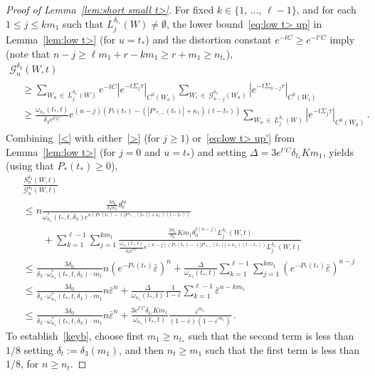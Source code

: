 \documentclass[10pt]{amsart}
\theoremstyle{definition}\newtheorem{defi}[theo]{Definition}\newtheorem{rema}[theo]{Remark}\newtheorem{exam}[theo]{Example}\newtheorem{exem}[theo]{Example}\newtheorem{nota}[theo]{Notation}
\newcommand{\cG}{\mathcal{G}}
\newcommand{\ve}{\varepsilon}
\begin{document}
\begin{proof}[Proof of Lemma~\ref{lem:short small t>}]
For fixed $k\in \{1,\,\ldots,\,\ell-1\}$, and for each $1\le j\le km_1$ such that $L_j^{\delta_{t_*}}(W)\ne \emptyset$, the lower bound~\eqref{eq:low t> up} in Lemma~\ref{lem:low t>} (for $u=t_*$) and the distortion constant $e^{-tC}\ge e^{-t'C}$ imply (note that $n-j\ge \ell m_1+r -km_1\ge r +m_1\ge n_{t_*}$),
\begin{multline}\label{>}
\cG_n^{\delta_3}(W,t)\\
\begin{aligned}
& \ge
\sum_{W_a\,\in\,L_j^{\delta_{t_*}}(W)} e^{-tC} \left|e^{-t\Sigma_{j} \tau}\right|_{C^0(W_a)}
\sum_{W_i\,\in\,\cG_{n-j}^{\delta_3}(W_a)}\left|e^{-t\Sigma_{n-j} \tau}\right|_{C^0(W_i)}
\\
& \ge \frac{\omega_{\kappa_1}(t_*,t)}{\delta_3 e^{t'C} } e^{(n-j)\left(P_*(t_*)-\left(\left| P'_{*,-}(t_*)\right| + \kappa_1\right)(t-t_*)\right)}
\sum_{W_a\,\in\,L_j^{\delta_{t_*}}(W)} \left| e^{-t\Sigma_{j} \tau}\right|_{C^0(W_a)} \,.
\end{aligned}
\end{multline}
Combining~\eqref{<} with either~\eqref{>} (for $j\ge 1$) or~\eqref{eq:low t> up'} from Lemma~\ref{lem:low t>} (for $j=0$ and $u=t_*$) and setting $\Delta= 3 e^{t'C} \delta_{t_*} Km_1 $, yields (using that $P_*(t_*)\ge 0$),
\begingroup
\allowdisplaybreaks
\begin{align}
&\frac{ S_n^{\delta_3}(W,t)}{ \cG_n^{\delta_3}(W,t) }\label{endSSP1}\\
& \le n
\frac{ \frac{3 \delta_0 } {\delta_3 m_1}
\theta_0^{t n}}{\omega_{\kappa_1}^*(t_*, t, \delta_3) e^{n(P_*(t_*)-(| P'_{*,-}(t_*)| + \kappa_1)(t-t_*))} }\nonumber\\
 & \qquad + \sum_{k=1}^{\ell-1} \sum_{j=1}^{km_1}
\frac{ \frac{3 \delta_{t_*}}{\delta_3} { Km_1} \theta_0^{t (n - j)} L_j^{\delta_{t_*}}(W,t) } {\frac{\omega_{\kappa_1}(t_*,t)}{\delta_3 e^{t'C}} e^{(n-j)(P_*(t_*)-(| P'_{*,-}(t_*)| + \kappa_1)(t-t_*))} L_j^{\delta_{t_*}}(W,t) }\nonumber\\
 & \le
\frac{3 \delta_0 } {\delta_3 \cdot \omega_{\kappa_1}^* (t_*,t,\delta_3)\cdot m_1} n (e^{-P_*(t_*)} \bar \ve)^n + \frac{ \Delta }{\omega_{\kappa_1}(t_*,t)}\sum_{k=1}^{\ell-1} \sum_{j=1}^{km_1} \left(e^{-P_*(t_*)}\bar \ve\right)^{n-j}\nonumber\\
 & \le \frac{ 3 \delta_0 }{\delta_3 \cdot \omega_{\kappa_1}^*(t_*,t,\delta_3) \cdot m_1} n \bar \ve^n + \frac{ \Delta }{\omega_{\kappa_1}(t_*,t)}\frac 1 {1-\bar \ve} \sum_{k=1}^{\ell-1} \bar \ve^{n-km_1}\nonumber\\
 & \le \frac{ 3 \delta_0 }{\delta_3 \cdot \omega_{\kappa_1}^*(t_*, t,\delta_3) \cdot m_1}n \bar \ve^n + \frac{ 3 e^{t'C} { \delta_{t_*} Km_1 } }{\omega_{\kappa_1}(t_*,t)} \frac{\bar \ve^{m_1}}{(1-\bar \ve)(1-\bar \ve^{m_1})}\,.\nonumber
\end{align}
\endgroup
To establish~\eqref{keyb}, choose first $m_1\ge n_{t_*}$ such that the second term is less than $1/8$ setting $\delta_{t}:=\delta_3(m_1)$, and then $n_{t} \ge m_1$ such that the first term is less than $1/8$, for $n \ge n_{t}$.


\end{proof}
\end{document}
